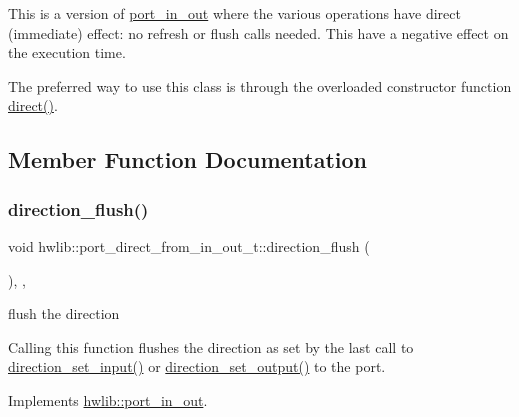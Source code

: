 This is a version of \hyperlink{classhwlib_1_1port__in__out}{port\+\_\+in\+\_\+out} where the various operations have direct (immediate) effect\+: no refresh or flush calls needed. This have a negative effect on the execution time.

The preferred way to use this class is through the overloaded constructor function \hyperlink{namespacehwlib_a43941b7f246ad934ee43dbfa0f5c8b5a}{direct()}. 

\subsection{Member Function Documentation}
\mbox{\label{classhwlib_1_1port__direct__from__in__out__t_a399d11ab7b3d583162c6bcaa584d2deb}} 
\subsubsection{\texorpdfstring{direction\+\_\+flush()}{direction\_flush()}}
{\footnotesize\ttfamily void hwlib\+::port\+\_\+direct\+\_\+from\+\_\+in\+\_\+out\+\_\+t\+::direction\+\_\+flush (\begin{DoxyParamCaption}{ }\end{DoxyParamCaption})\hspace{0.3cm}{\ttfamily [inline]}, {\ttfamily [override]}, {\ttfamily [virtual]}}

flush the direction

Calling this function flushes the direction as set by the last call to \hyperlink{classhwlib_1_1port__direct__from__in__out__t_ad4aa8a6a665220be275597d7b00a306c}{direction\+\_\+set\+\_\+input()} or \hyperlink{classhwlib_1_1port__direct__from__in__out__t_a8702543e5a779026dd0b8602aaf5ae56}{direction\+\_\+set\+\_\+output()} to the port. 

Implements \hyperlink{classhwlib_1_1port__in__out_a431b79eee48a21a93978bfdf6620f800}{hwlib\+::port\+\_\+in\+\_\+out}.

\mbox{\label{classhwlib_1_1port__direct__from__in__out__t_ad4aa8a6a665220be275597d7b00a306c}} 
